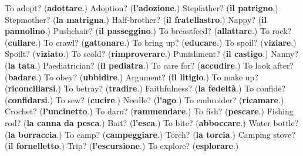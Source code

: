 \begin{tcolorbox}[breakable,colback=teal!4,colframe=teal!35!black,title={Before you move on}]
To adopt? (\textbf{adottare}.) Adoption? (\textbf{l'adozione}.) Stepfather? (\textbf{il patrigno}.) Stepmother? (\textbf{la matrigna}.) Half-brother? (\textbf{il fratellastro}.) Nappy? (\textbf{il pannolino}.) Pushchair? (\textbf{il passeggino}.) To breastfeed? (\textbf{allattare}.) To rock? (\textbf{cullare}.) To crawl? (\textbf{gattonare}.) To bring up? (\textbf{educare}.) To spoil? (\textbf{viziare}.) Spoilt? (\textbf{viziato}.) To scold? (\textbf{rimproverare}.) Punishment? (\textbf{il castigo}.) Nanny? (\textbf{la tata}.) Paediatrician? (\textbf{il pediatra}.) To care for? (\textbf{accudire}.) To look after? (\textbf{badare}.) To obey? (\textbf{ubbidire}.) Argument? (\textbf{il litigio}.) To make up? (\textbf{riconciliarsi}.) To betray? (\textbf{tradire}.) Faithfulness? (\textbf{la fedeltà}.) To confide? (\textbf{confidarsi}.) To sew? (\textbf{cucire}.) Needle? (\textbf{l'ago}.) To embroider? (\textbf{ricamare}.) Crochet? (\textbf{l'uncinetto}.) To darn? (\textbf{rammendare}.) To fish? (\textbf{pescare}.) Fishing rod? (\textbf{la canna da pesca}.) Bait? (\textbf{l'esca}.) To bite? (\textbf{abboccare}.) Water bottle? (\textbf{la borraccia}.) To camp? (\textbf{campeggiare}.) Torch? (\textbf{la torcia}.) Camping stove? (\textbf{il fornelletto}.) Trip? (\textbf{l'escursione}.) To explore? (\textbf{esplorare}.)
\end{tcolorbox}
